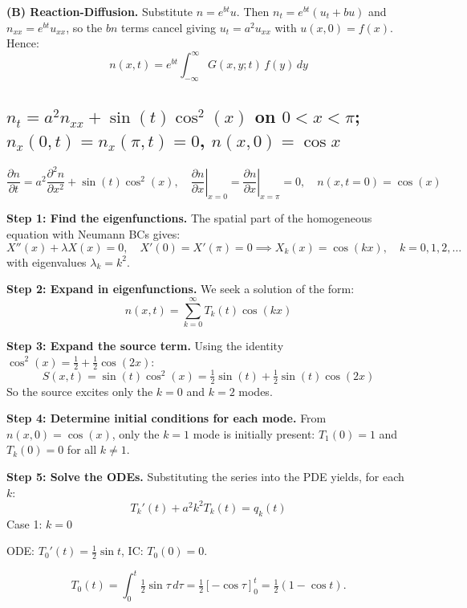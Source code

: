 \documentclass[a4paper,11pt]{article} %
\begin{document}
\textbf{(B) Reaction-Diffusion.} Substitute $n=e^{bt}u$. Then $n_t=e^{bt}(u_t+bu)$ and $n_{xx}=e^{bt}u_{xx}$, so the $bn$ terms cancel giving $u_t=a^2u_{xx}$ with $u(x,0)=f(x)$. Hence:
\begin{equation}
    \boxed{ n(x,t) = e^{bt}\int_{-\infty}^{\infty} G(x,y;t)\,f(y)\,dy }
\end{equation}


\newpage
\subsection{\texorpdfstring{$n_t = a^2 n_{xx} + \sin(t)\cos^2(x)$ on $0<x<\pi$; $n_x(0,t)=n_x(\pi,t)=0$, $n(x,0)=\cos x$}{Heat eq with oscillating source; Neumann BCs; three active modes k=0,1,2}}

\begin{problembox}
    $$\frac{\partial n}{\partial t} = a^2 \frac{\partial^2 n}{\partial x^2} + \sin(t)\cos^2(x),\quad \left. \frac{\partial n}{\partial x} \right|_{x=0} = \left. \frac{\partial n}{\partial x} \right|_{x=\pi} = 0,\quad n(x, t=0) = \cos(x)$$
\end{problembox}

\textbf{Step 1: Find the eigenfunctions.}
The spatial part of the homogeneous equation with Neumann BCs gives:
$$X''(x) + \lambda X(x) = 0,\quad X'(0) = X'(\pi) = 0 \implies X_k(x) = \cos(kx), \quad k = 0, 1, 2, \dots$$
with eigenvalues $\lambda_k = k^2$.

\textbf{Step 2: Expand in eigenfunctions.}
We seek a solution of the form:
$$n(x,t) = \sum_{k=0}^{\infty} T_k(t) \cos(kx)$$

\textbf{Step 3: Expand the source term.}
Using the identity $\cos^2(x) = \tfrac{1}{2} + \tfrac{1}{2}\cos(2x)$:
\[S(x,t) = \sin(t)\cos^2(x) = \tfrac{1}{2}\sin(t) + \tfrac{1}{2}\sin(t)\cos(2x)\]
So the source excites only the $k=0$ and $k=2$ modes.

\textbf{Step 4: Determine initial conditions for each mode.}
From $n(x,0) = \cos(x)$, only the $k=1$ mode is initially present: $T_1(0) = 1$ and $T_k(0) = 0$ for all $k \neq 1$.

\textbf{Step 5: Solve the ODEs.}
Substituting the series into the PDE yields, for each $k$:
\[T_k'(t) + a^2 k^2 T_k(t) = q_k(t)\]
Case 1: \(k=0\)

ODE: \(T_0'(t) = \tfrac12\sin t\), IC: \(T_0(0) = 0\).

\[
T_0(t) = \int_0^t \tfrac12 \sin\tau\,d\tau 
= \tfrac12[-\cos\tau]_0^t 
= \tfrac12(1-\cos t).
\]
\end{document}
